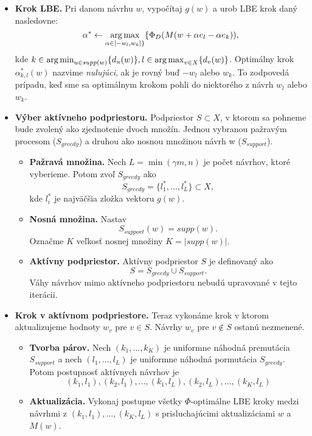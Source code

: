 \begin{itemize}
	\item \textbf{Krok LBE.} Pri danom návrhu $w$, vypočítaj $g(w)$ a urob LBE krok daný nasledovne: $$\alpha^* \leftarrow \operatorname*{arg\,max}_{\alpha \in [-w_l, w_k] \}} \{ \Phi_D (M(w+\alpha e_l -\alpha e_k)),$$ kde 
	$k \in \operatorname*{arg\,min}_{u \in supp(w)} \{ d_u(w)\}, l \in \operatorname*{arg\,max}_{v \in X} \{ d_v(w)\}$. Optimálny krok $\alpha^*_{k,l}(w)$ nazvime \textit{nulujúci}, ak je rovný buď $-w_l$ alebo $w_k$. To zodpovedá prípadu, keď sme sa optimálnym krokom pohli do niektorého z návrh $w_l$ alebo $w_k$.

	\item \textbf{Výber aktívneho podpriestoru.} Podpriestor $S \subset X$, v ktorom sa pohneme bude zvolený ako zjednotenie dvoch množín. Jednou vybranou pažravým procesom ($S_{greedy}$) a druhou ako nosnou množinou návrh w ($S_{support}$).
	\begin{itemize}
		\item \textbf{Pažravá množina.} Nech $L=\min (\gamma m, n)$ je počet návrhov, ktoré vyberieme. Potom zvoľ $S_{greedy}$ ako $$S_{greedy} = \{l_1^*, \dots, l_L^* \} \subset X,$$ kde $l_i^*$ je najväčšia zložka vektoru $g(w)$.
		\item \textbf{Nosná množina.} Nastav $$S_{support}(w)=supp(w).$$ Označme $K$ veľkosť nosnej množiny $K= |supp(w)|$.
		\item \textbf{Aktívny podpriestor.} Aktívny podpriestor $S$ je definovaný ako $$S=S_{greedy} \cup S_{support}.$$ Váhy návrhov mimo aktívneho podpriestoru nebudú upravované v tejto iterácii.
	\end{itemize}

	\item \textbf{Krok v aktívnom podpriestore.} Teraz vykonáme krok v ktorom aktualizujeme hodnoty $w_v$ pre $v \in S$. Návrhy $w_v$ pre $v \not \in S$ ostanú nezmenené.
	\begin{itemize}
		\item \textbf{Tvorba párov.} Nech $(k_1, \dots, k_K)$ je uniformne náhodná premutácia $S_{support}$ a nech $(l_1, \dots, l_L)$ je uniformne náhodná pormutácia $S_{greedy}$. Potom postupnosť aktívnych návrhov je $$ (k_1,l_1), (k_2, l_1), \dots, (k_1, l_L), (k_2,l_L), \dots, (k_K, l_L) $$
		\item \textbf{Aktualizácia.} Vykonaj postupne všetky $\Phi$-optimálne LBE kroky medzi návrhmi z $ (k_1,l_1), \dots, (k_K, l_L)$ s prisluchajúcimi aktualizáciami $w$ a $M(w)$.
	\end{itemize}
\end{itemize}


